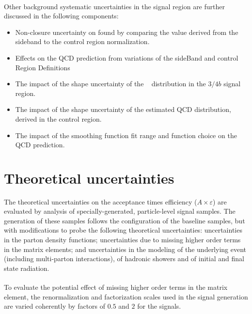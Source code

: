 \paragraph{}
Other background systematic uncertainties in the signal region are further discussed in the following components:
\begin{itemize}
 \item Non-closure uncertainty on \muqcd found by comparing the value derived from the sideband to the control region normalization.
 \item Effects on the QCD prediction from variations of the sideBand and control Region Definitions
 \item The impact of the shape uncertainty of the \ttbar~ distribution in the $3/4b$ signal region.
 \item The impact of the shape uncertainty of the estimated QCD distribution, derived in the control region.
 \item The impact of the smoothing function fit range and function choice on the QCD prediction.
\end{itemize}

\section{Theoretical uncertainties}
\label{sec:boosted-systematics-theory}
\paragraph{}
The theoretical uncertainties on the acceptance times efficiency ($A\times\varepsilon$) are evaluated by analysis of specially-generated, particle-level signal samples. 
The generation of these samples follows the configuration of the baseline samples, but with modifications to probe the following theoretical uncertainties: uncertainties in the parton density functions; uncertainties due to missing higher order terms in the matrix elements; and uncertainties in the modeling of the underlying event (including multi-parton interactions), of hadronic showers and of initial and final state radiation.

\paragraph{}
To evaluate the potential effect of missing higher order terms in the matrix element, the renormalization and factorization scales used in the signal generation are varied coherently by factors of $0.5$ and $2$ for the signals. 

